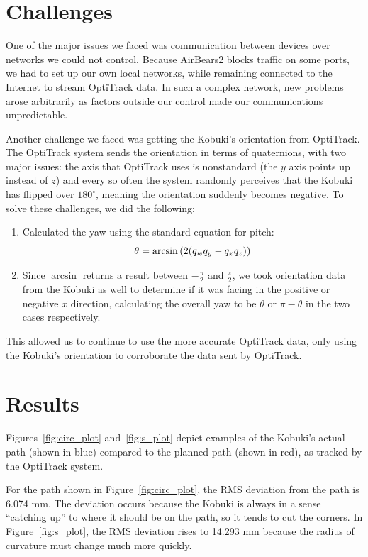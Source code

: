 \documentclass[10pt]{article}
\begin{document}
\begin{multicols*}{2}
  \section*{Challenges}
  One of the major issues we faced was communication between devices over
  networks we could not control. Because AirBears2 blocks traffic on some ports,
  we had to set up our own local networks, while remaining connected to the
  Internet to stream OptiTrack data. In such a complex network, new problems
  arose arbitrarily as factors outside our control made our communications
  unpredictable.

  Another challenge we faced was getting the Kobuki's orientation from
  OptiTrack. The OptiTrack system sends the orientation in terms of quaternions,
  with two major issues: the axis that OptiTrack uses is nonstandard (the $y$
  axis points up instead of $z$) and every so often the system randomly
  perceives that the Kobuki has flipped over $180^{\circ}$, meaning the
  orientation suddenly becomes negative. To solve these challenges, we did the
  following:
  \begin{enumerate}
    \item Calculated the yaw using the standard equation for pitch:
      \cite{wiki:quat}
      $$\theta = \arcsin\left(2(q_w q_y - q_x q_z)\right)$$
    \item Since $\arcsin$ returns a result between $-\frac{\pi}{2}$ and
      $\frac{\pi}{2}$, we took orientation data from the Kobuki as well to
      determine if it was facing in the positive or negative $x$ direction,
      calculating the overall yaw to be $\theta$ or $\pi-\theta$ in the two
      cases respectively.
  \end{enumerate}
  This allowed us to continue to use the more accurate OptiTrack data, only
  using the Kobuki's orientation to corroborate the data sent by OptiTrack.

  \section*{Results}
  Figures~\ref{fig:circ_plot} and~\ref{fig:s_plot} depict examples of the
  Kobuki's actual path (shown in blue) compared to the planned path (shown in
  red), as tracked by the OptiTrack system.

  For the path shown in Figure~\ref{fig:circ_plot}, the RMS deviation from the
  path is 6.074 mm. The deviation occurs because the Kobuki is always in a sense
  ``catching up'' to where it should be on the path, so it tends to cut the
  corners. In Figure~\ref{fig:s_plot}, the RMS deviation rises to 14.293 mm
  because the radius of curvature must change much more quickly.


\end{multicols*}
\end{document}
